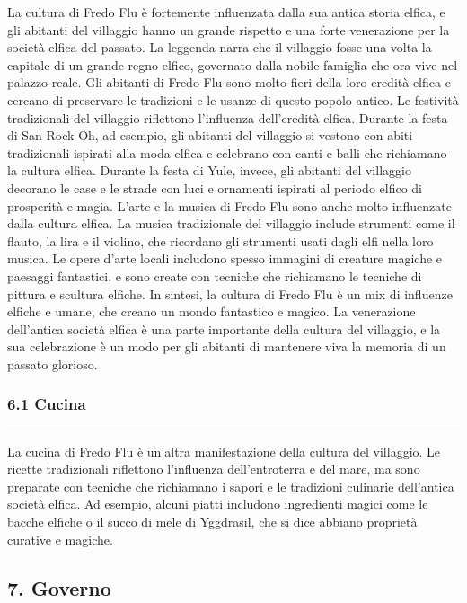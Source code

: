 La cultura di Fredo Flu è fortemente influenzata dalla sua antica storia
elfica, e gli abitanti del villaggio hanno un grande rispetto e una
forte venerazione per la società elfica del passato. La leggenda narra
che il villaggio fosse una volta la capitale di un grande regno elfico,
governato dalla nobile famiglia che ora vive nel palazzo reale. Gli
abitanti di Fredo Flu sono molto fieri della loro eredità elfica e
cercano di preservare le tradizioni e le usanze di questo popolo antico.
Le festività tradizionali del villaggio riflettono l'influenza
dell'eredità elfica. Durante la festa di San Rock-Oh, ad esempio, gli
abitanti del villaggio si vestono con abiti tradizionali ispirati alla
moda elfica e celebrano con canti e balli che richiamano la cultura
elfica. Durante la festa di Yule, invece, gli abitanti del villaggio
decorano le case e le strade con luci e ornamenti ispirati al periodo
elfico di prosperità e magia. L'arte e la musica di Fredo Flu sono anche
molto influenzate dalla cultura elfica. La musica tradizionale del
villaggio include strumenti come il flauto, la lira e il violino, che
ricordano gli strumenti usati dagli elfi nella loro musica. Le opere
d'arte locali includono spesso immagini di creature magiche e paesaggi
fantastici, e sono create con tecniche che richiamano le tecniche di
pittura e scultura elfiche. In sintesi, la cultura di Fredo Flu è un mix
di influenze elfiche e umane, che creano un mondo fantastico e magico.
La venerazione dell'antica società elfica è una parte importante della
cultura del villaggio, e la sua celebrazione è un modo per gli abitanti
di mantenere viva la memoria di un passato glorioso.

\subsubsection{6.1 Cucina}\label{cucina}

\begin{center}\rule{0.5\linewidth}{0.5pt}\end{center}

La cucina di Fredo Flu è un'altra manifestazione della cultura del
villaggio. Le ricette tradizionali riflettono l'influenza
dell'entroterra e del mare, ma sono preparate con tecniche che
richiamano i sapori e le tradizioni culinarie dell'antica società
elfica. Ad esempio, alcuni piatti includono ingredienti magici come le
bacche elfiche o il succo di mele di Yggdrasil, che si dice abbiano
proprietà curative e magiche.

\subsection{7. Governo}\label{governo}

